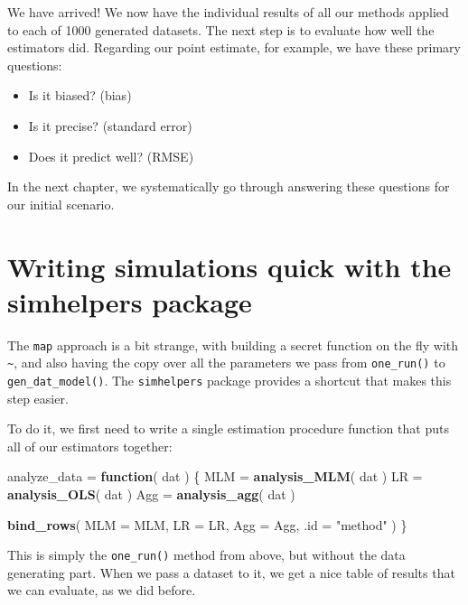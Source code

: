\documentclass[
]{book}
\newenvironment{Shaded}{\begin{snugshade}}{\end{snugshade}}
\newcommand{\AttributeTok}[1]{\textcolor[rgb]{0.13,0.29,0.53}{#1}}
\newcommand{\ControlFlowTok}[1]{\textcolor[rgb]{0.13,0.29,0.53}{\textbf{#1}}}
\newcommand{\FunctionTok}[1]{\textcolor[rgb]{0.13,0.29,0.53}{\textbf{#1}}}
\newcommand{\NormalTok}[1]{#1}
\newcommand{\OtherTok}[1]{\textcolor[rgb]{0.56,0.35,0.01}{#1}}
\newcommand{\StringTok}[1]{\textcolor[rgb]{0.31,0.60,0.02}{#1}}
\providecommand{\tightlist}{%
  \setlength{\itemsep}{0pt}\setlength{\parskip}{0pt}}
\begin{document}
We have arrived! We now have the individual results of all our methods applied to each of 1000 generated datasets.
The next step is to evaluate how well the estimators did.
Regarding our point estimate, for example, we have these primary questions:

\begin{itemize}
\tightlist
\item
  Is it biased? (bias)
\item
  Is it precise? (standard error)
\item
  Does it predict well? (RMSE)
\end{itemize}

In the next chapter, we systematically go through answering these questions for our initial scenario.

\section{Writing simulations quick with the simhelpers package}\label{writing-simulations-quick-with-the-simhelpers-package}

The \texttt{map} approach is a bit strange, with building a secret function on the fly with \texttt{\textasciitilde{}}, and also having the copy over all the parameters we pass from \texttt{one\_run()} to \texttt{gen\_dat\_model()}.
The \texttt{simhelpers} package provides a shortcut that makes this step easier.

To do it, we first need to write a single estimation procedure function that puts all of our estimators together:

\begin{Shaded}
\begin{Highlighting}[]
\NormalTok{analyze\_data }\OtherTok{=} \ControlFlowTok{function}\NormalTok{( dat ) \{}
\NormalTok{  MLM }\OtherTok{=} \FunctionTok{analysis\_MLM}\NormalTok{( dat )}
\NormalTok{  LR }\OtherTok{=} \FunctionTok{analysis\_OLS}\NormalTok{( dat )}
\NormalTok{  Agg }\OtherTok{=} \FunctionTok{analysis\_agg}\NormalTok{( dat )}
  
  \FunctionTok{bind\_rows}\NormalTok{( }\AttributeTok{MLM =}\NormalTok{ MLM, }\AttributeTok{LR =}\NormalTok{ LR, }\AttributeTok{Agg =}\NormalTok{ Agg,}
             \AttributeTok{.id =} \StringTok{"method"}\NormalTok{ )}
\NormalTok{\}}
\end{Highlighting}
\end{Shaded}

This is simply the \texttt{one\_run()} method from above, but without the data generating part.
When we pass a dataset to it, we get a nice table of results that we can evaluate, as we did before.
\end{document}
